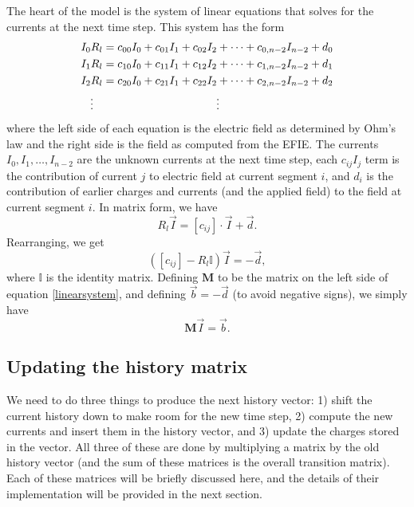 \documentclass{article}
\newcommand{\mat}{\mathbf}
\begin{document}
The heart of the model is the system of linear equations that solves for the currents at the next time step. This system has the form
\begin{align}
\begin{split}
I_0R_l &= c_{00}I_0 + c_{01}I_1 + c_{02}I_2 + \cdots + c_{0,n-2}I_{n-2} + d_0 \\
I_1R_l &= c_{10}I_0 + c_{11}I_1 + c_{12}I_2 + \cdots + c_{1,n-2}I_{n-2} + d_1 \\
I_2R_l &= c_{20}I_0 + c_{21}I_1 + c_{22}I_2 + \cdots + c_{2,n-2}I_{n-2} + d_2 \\
\vdotswithin{I_2R_l} & \vdotswithin{= c_{20}I_0 + c_{21}I_1 + c_{22}I_2 + \cdots + c_{2,n-2}I_{n-2} + d_2}
\end{split}
\end{align}
where the left side of each equation is the electric field as determined by Ohm's law and the right side is the field as computed from the EFIE. The currents $I_0, I_1, \ldots, I_{n-2}$ are the unknown currents at the next time step, each $c_{ij}I_j$ term is the contribution of current $j$ to electric field at current segment $i$, and $d_i$ is the contribution of earlier charges and currents (and the applied field) to the field at current segment $i$. In matrix form, we have
\begin{equation}
R_l\vec{I} = \left[c_{ij}\right] \cdot \vec{I} + \vec{d}.
\end{equation}
Rearranging, we get
\begin{equation}
\label{linearsystem}
\left(\left[c_{ij}\right] - R_l\mathbb{I}\right) \vec{I} = -\vec{d},
\end{equation}
where $\mathbb{I}$ is the identity matrix. Defining $\mat{M}$ to be the matrix on the left side of equation \ref{linearsystem}, and defining $\vec{b} = -\vec{d}$ (to avoid negative signs), we simply have
\begin{equation}
\label{mib}
\mat{M} \vec{I} = \vec{b}.
\end{equation}

\subsection{Updating the history matrix}
We need to do three things to produce the next history vector: 1) shift the current history down to make room for the new time step, 2) compute the new currents and insert them in the history vector, and 3) update the charges stored in the vector. All three of these are done by multiplying a matrix by the old history vector (and the sum of these matrices is the overall transition matrix). Each of these matrices will be briefly discussed here, and the details of their implementation will be provided in the next section.
\end{document}
